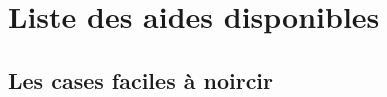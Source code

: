 
\newcommand{\titre}{{\Huge Manuel Aide}\\Groupe B}
\newcommand{\titrehead}{Aide}






\chapter{Liste des aides disponibles}


\section{Les cases faciles à noircir}
	\paragraph{}
